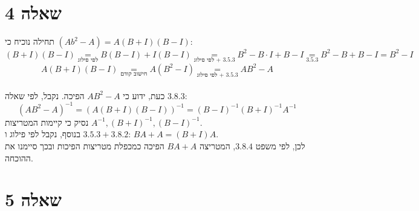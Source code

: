 \documentclass{article}
\newcommand\underrel[2]{\mathrel{\mathop{#2}\limits_{#1}}}
\begin{document}
\section*{שאלה 4}

תחילה נוכיח כי $(Ab^2-A)=A(B+I)(B-I)$:
\[
    (B+I)(B-I) \underrel{\text{לפי פילוג}}{=}
    B(B-I) + I(B-I) \underrel{\text{לפי פילוג + $3.5.3$}}{=}
    B^2-B\cdot I+B-I \underrel{3.5.3}{=}
    B^2-B+B-I =
    B^2-I
\]
\[
    A(B+I)(B-I) \underrel{\text{חישוב קודם}}{=}
    A(B^2-I) \underrel{\text{לפי פילוג + $3.5.3$}}{=}
    AB^2-A
\]
\\
כעת, ידוע כי $AB^2-A$ הפיכה.
נקבל, לפי שאלה $3.8.3$:
\[
    (AB^2-A)^{-1}=(A(B+I)(B-I))^{-1}=(B-I)^{-1}(B+I)^{-1}A^{-1}
\]
נסיק כי קיימות המטריצות $A^{-1}, (B+I)^{-1}, (B-I)^{-1}$. \\
בנוסף, נקבל לפי פילוג ו $3.5.3+3.8.2$:
$
    BA+A=(B+I)A
$. \\
לכן, לפי משפט $3.8.4$,
המטריצה $BA+A$
הפיכה כמכפלת מטריצות הפיכות ובכך סיימנו את ההוכחה.

\pagebreak

\section*{שאלה 5}
\end{document}
